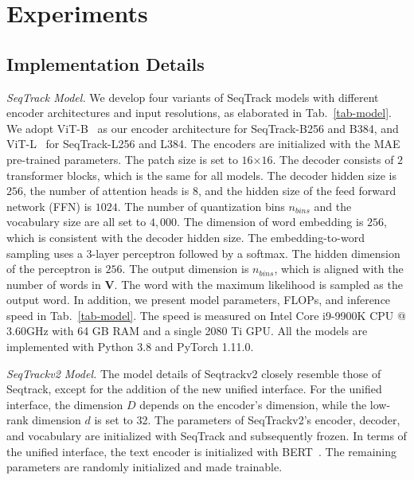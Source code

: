 \section{Experiments}
\label{sec:Experiments}

\subsection{Implementation Details}
\label{subsec:Implementation Details}

\textit{SeqTrack Model.}
We develop four variants of SeqTrack models with different encoder architectures and input resolutions, as elaborated in Tab.~\ref{tab-model}. We adopt ViT-B~\cite{ViT} as our encoder architecture for SeqTrack-B256 and B384, and ViT-L~\cite{ViT} for SeqTrack-L256 and L384. The encoders are initialized with the MAE~\cite{mae} pre-trained parameters. The patch size is set to $16$$\times$$16$.
The decoder consists of $2$ transformer blocks, which is the same for all models. The decoder hidden size is $256$, the number of attention heads is $8$, and the hidden size of the feed forward network (FFN) is $1024$.
The number of quantization bins $n_{bins}$ and the vocabulary size are all set to $4,000$. The dimension of word embedding is $256$, which is consistent with the decoder hidden size. The embedding-to-word sampling uses a 3-layer perceptron followed by a softmax. The hidden dimension of the perceptron is $256$. The output dimension is $n_{bins}$, which is aligned with the number of words in $\bm{V}$. The word with the maximum likelihood is sampled as the output word. In addition, we present model parameters, FLOPs, and inference speed in Tab.~\ref{tab-model}. The speed is measured on Intel Core i9-9900K CPU @ 3.60GHz with 64 GB RAM and a single 2080 Ti GPU. All the models are implemented with Python 3.8 and PyTorch 1.11.0. 

\textit{SeqTrackv2 Model.}
The model details of Seqtrackv2 closely resemble those of Seqtrack, except for the addition of the new unified interface. For the unified interface, the dimension $D$ depends on the encoder's dimension, while the low-rank dimension $d$ is set to 32. The parameters of SeqTrackv2's encoder, decoder, and vocabulary are initialized with SeqTrack and subsequently frozen. In terms of the unified interface, the text encoder is initialized with BERT~\cite{BERT}. The remaining parameters are randomly initialized and made trainable.

